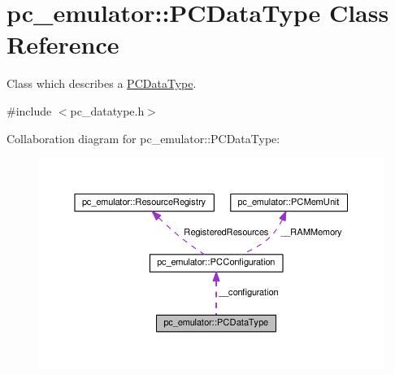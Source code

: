 \hypertarget{classpc__emulator_1_1PCDataType}{}\section{pc\+\_\+emulator\+:\+:P\+C\+Data\+Type Class Reference}
\label{classpc__emulator_1_1PCDataType}


Class which describes a \hyperlink{classpc__emulator_1_1PCDataType}{P\+C\+Data\+Type}.  




{\ttfamily \#include $<$pc\+\_\+datatype.\+h$>$}



Collaboration diagram for pc\+\_\+emulator\+:\+:P\+C\+Data\+Type\+:
\nopagebreak
\begin{figure}[H]
\begin{center}
\leavevmode
\includegraphics[width=350pt]{classpc__emulator_1_1PCDataType__coll__graph}
\end{center}
\end{figure}
